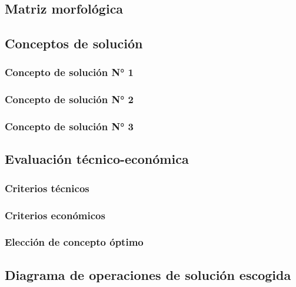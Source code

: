 \subsection{Matriz morfológica}

\subsection{Conceptos de solución}

\subsubsection{Concepto de solución N° 1}

\subsubsection{Concepto de solución N° 2}

\subsubsection{Concepto de solución N° 3}

\subsection{Evaluación técnico-económica}

\subsubsection{Criterios técnicos}

\subsubsection{Criterios económicos}

\subsubsection{Elección de concepto óptimo}

\subsection{Diagrama de operaciones de solución escogida}





